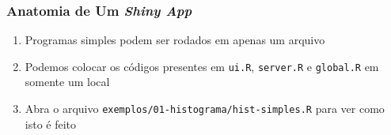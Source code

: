 \documentclass[12pt, compress, usetitleprogressbar]{beamer}\usepackage[]{graphicx}\usepackage[]{color}
\begin{document}












\begin{frame}

\frametitle{Anatomia de Um \emph{Shiny App}}

\begin{enumerate}[label=$\bullet$, leftmargin=*]

  \item Programas simples podem ser rodados em apenas um arquivo

  \item Podemos colocar os códigos presentes em \texttt{ui.R}, \texttt{server.R} e \texttt{global.R} em somente um local

  \item Abra o arquivo \texttt{exemplos/01-histograma/hist-simples.R} para ver como isto é feito

\end{enumerate}

\end{frame}







\begin{comment}


\begin{frame}[fragile]

\frametitle{Anatomia de Um \emph{Shiny App}}



\end{frame}


\end{comment}















\end{document}
